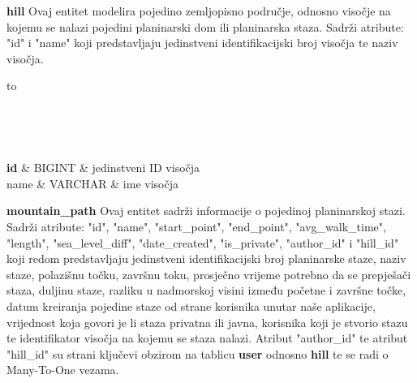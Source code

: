 \textbf{hill} Ovaj entitet modelira pojedino zemljopisno područje, odnosno visočje na kojemu se nalazi pojedini planinarski dom ili planinarska staza. Sadrži atribute: "id" i "name" koji predstavljaju jedinstveni identifikacijski broj visočja te naziv visočja.

\begin{longtabu} to \textwidth {|X[6, l]|X[6, l]|X[20, l]|}

\hline {}	 \\[3pt] \hline
\endfirsthead

\hline {}	 \\[3pt] \hline
\endhead

\hline 
\endlastfoot

\textbf{id} & BIGINT	&  jedinstveni ID visočja 	\\ \hline
name & VARCHAR	&  ime visočja 	\\ \hline


\end{longtabu}
\vspace{10mm}

\textbf{mountain\_path} Ovaj entitet sadrži informacije o pojedinoj planinarskoj stazi. Sadrži atribute: "id", "name", "start\_point", "end\_point", "avg\_walk\_time", "length", "sea\_level\_diff", "date\_created", "is\_private", "author\_id" i "hill\_id" koji redom predstavljaju jedinstveni identifikacijski broj planinarske staze, naziv staze, polazišnu točku, završnu toku, prosječno vrijeme potrebno da se prepješači staza, duljinu staze, razliku u nadmorskoj visini između početne i završne točke, datum kreiranja pojedine staze od strane korisnika unutar naše aplikacije, vrijednost koja govori je li staza privatna ili javna, korisnika koji je stvorio stazu te identifikator visočja na kojemu se staza nalazi. Atribut "author\_id" te atribut "hill\_id" su strani ključevi obzirom na tablicu \textbf{user} odnosno \textbf{hill} te se radi o Many-To-One vezama.

